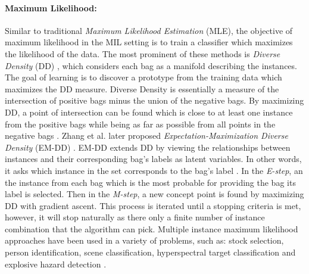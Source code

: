 \paragraph{Maximum Likelihood:}
Similar to traditional \textit{Maximum Likelihood Estimation} (MLE), the objective of maximum likelihood in the MIL setting is to train a classifier which maximizes the likelihood of the data.  The most prominent of these methods is \textit{Diverse Density} (DD) \citep{Maron1998DiverseDensity}, which considers each bag as a manifold describing the instances.  The goal of learning is to discover a prototype  from the training data which maximizes the DD measure.  Diverse Density is essentially a measure of the intersection of positive bags minus the union of the negative bags.  By maximizing DD, a point of intersection can be found which is close to at least one instance  from the positive bags while being as far as possible from all points in the negative bags \citep{Ghaffarzadegan2018MILVAE}.   Zhang et al. later proposed \textit{Expectation-Maximization Diverse Density} (EM-DD) \citep{Zhang2002EMDD}. EM-DD extends DD by viewing the relationships between instances and their corresponding bag's labels as latent variables.  In other words, it asks which instance in the set corresponds to the bag's label \citep{Du2017Thesis}. In the \textit{E-step}, an the instance from each bag which is the most probable for providing the bag its label is selected.  Then in the \textit{M-step}, a new concept point is found by maximizing DD with gradient ascent.  This process is iterated until a stopping criteria is met, however, it will stop naturally as there only a finite number of instance combination that the algorithm can pick.  Multiple instance maximum likelihood approaches have been used in a variety of problems, such as: stock selection, person identification, scene classification, hyperspectral target classification and explosive hazard detection \citep{Maron1998DiverseDensity, Maron1998MILSceneClassification, Zare2016MIACE, Zare2015MILLandmineEMI, Bocinsky2019SPIEMIACEInitialization, Mccurley2019SPIEWEMIComparison}.    

 

